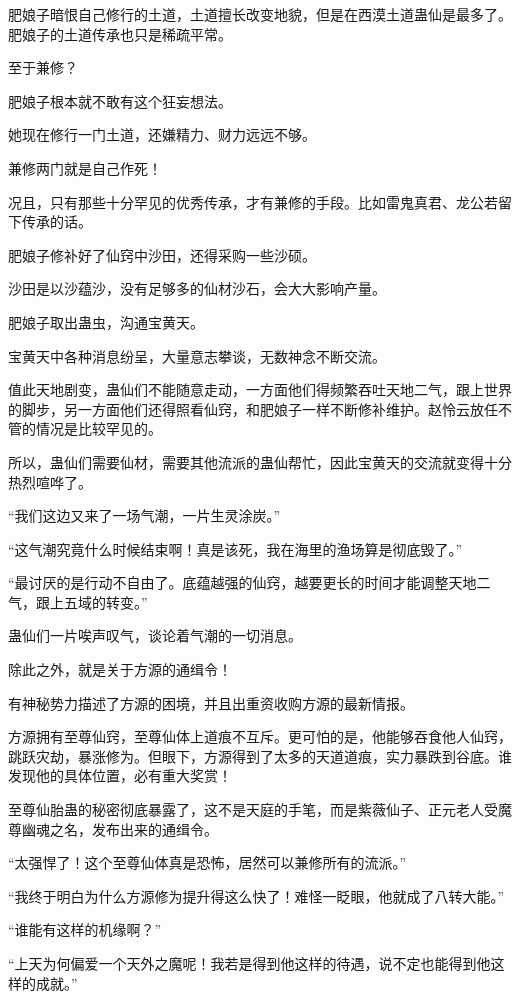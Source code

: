 \begin{this_body}
肥娘子暗恨自己修行的土道，土道擅长改变地貌，但是在西漠土道蛊仙是最多了。肥娘子的土道传承也只是稀疏平常。

至于兼修？

肥娘子根本就不敢有这个狂妄想法。

她现在修行一门土道，还嫌精力、财力远远不够。

兼修两门就是自己作死！

况且，只有那些十分罕见的优秀传承，才有兼修的手段。比如雷鬼真君、龙公若留下传承的话。

肥娘子修补好了仙窍中沙田，还得采购一些沙硕。

沙田是以沙蕴沙，没有足够多的仙材沙石，会大大影响产量。

肥娘子取出蛊虫，沟通宝黄天。

宝黄天中各种消息纷呈，大量意志攀谈，无数神念不断交流。

值此天地剧变，蛊仙们不能随意走动，一方面他们得频繁吞吐天地二气，跟上世界的脚步，另一方面他们还得照看仙窍，和肥娘子一样不断修补维护。赵怜云放任不管的情况是比较罕见的。

所以，蛊仙们需要仙材，需要其他流派的蛊仙帮忙，因此宝黄天的交流就变得十分热烈喧哗了。

“我们这边又来了一场气潮，一片生灵涂炭。”

“这气潮究竟什么时候结束啊！真是该死，我在海里的渔场算是彻底毁了。”

“最讨厌的是行动不自由了。底蕴越强的仙窍，越要更长的时间才能调整天地二气，跟上五域的转变。”

蛊仙们一片唉声叹气，谈论着气潮的一切消息。

除此之外，就是关于方源的通缉令！

有神秘势力描述了方源的困境，并且出重资收购方源的最新情报。

方源拥有至尊仙窍，至尊仙体上道痕不互斥。更可怕的是，他能够吞食他人仙窍，跳跃灾劫，暴涨修为。但眼下，方源得到了太多的天道道痕，实力暴跌到谷底。谁发现他的具体位置，必有重大奖赏！

至尊仙胎蛊的秘密彻底暴露了，这不是天庭的手笔，而是紫薇仙子、正元老人受魔尊幽魂之名，发布出来的通缉令。

“太强悍了！这个至尊仙体真是恐怖，居然可以兼修所有的流派。”

“我终于明白为什么方源修为提升得这么快了！难怪一眨眼，他就成了八转大能。”

“谁能有这样的机缘啊？”

“上天为何偏爱一个天外之魔呢！我若是得到他这样的待遇，说不定也能得到他这样的成就。”


\end{this_body}
